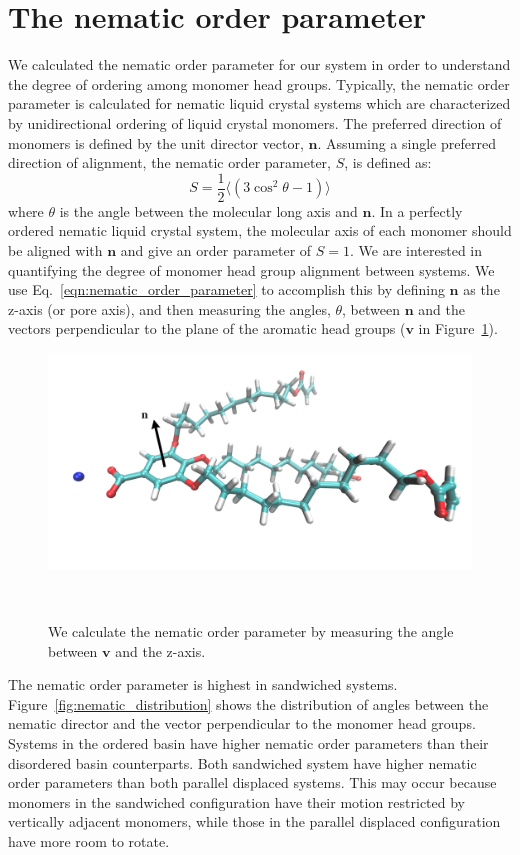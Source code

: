 \documentclass[journal=jpcbfk,manusciprt=article]{achemso}
\begin{document}
  \section{The nematic order parameter}\label{method:nematic_order}

  We calculated the nematic order parameter for our system in order to
  understand the degree of ordering among monomer head groups. Typically, the
  nematic order parameter is calculated for nematic liquid crystal systems which
  are characterized by unidirectional ordering of liquid crystal monomers. The
  preferred direction of monomers is defined by the unit director vector,
  $\mathbf{n}$. Assuming a single preferred direction of alignment, the nematic
  order parameter, $S$, is defined as:
  \begin{equation}
	 S = \frac{1}{2} \langle(3\cos^2\theta -1)\rangle
	\label{eqn:nematic_order_parameter}
  \end{equation}
  where $\theta$ is the angle between the molecular long axis and $\mathbf{n}$.
  In a perfectly ordered nematic liquid crystal system, the molecular axis of each
  monomer should be aligned with $\mathbf{n}$ and give an order parameter of $S=1$. 
  We are interested in quantifying the degree of monomer head group alignment 
  between systems. We use Eq.~\ref{eqn:nematic_order_parameter} to accomplish this
  by defining $\mathbf{n}$ as the z-axis (or pore axis), and then measuring the angles,
  $\theta$, between $\mathbf{n}$ and the vectors perpendicular to the plane of
  the aromatic head groups ($\mathbf{v}$ in Figure~\ref{fig:director}). 
  
  \begin{figure}[!htb]
	\centering
	\includegraphics[width=0.75\linewidth]{nematic_director.png}
	\caption{We calculate the nematic order parameter by measuring the angle
	between $\mathbf{v}$ and the z-axis.}~\label{fig:director}
  \end{figure}

  The nematic order parameter is highest in sandwiched systems. 
  Figure~\ref{fig:nematic_distribution} shows the distribution of angles between
  the nematic director and the vector perpendicular to the monomer head groups. 
  Systems in the ordered basin have higher nematic order parameters than their
  disordered basin counterparts. Both sandwiched system have higher nematic order
  parameters than both parallel displaced systems. This may occur because monomers
  in the sandwiched configuration have their motion restricted by vertically adjacent
  monomers, while those in the parallel displaced configuration have more room to 
  rotate.
\end{document}
